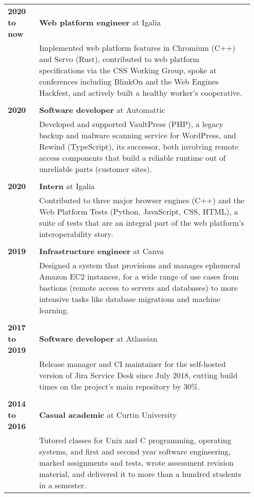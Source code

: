 \documentclass[a4paper,12pt]{article}
\begin{document}
\begin{tabular}{p{35mm}p{125mm}}
	                    \textbf{2020 to now}        & \textbf{Web platform engineer} at Igalia
	\vspace{0.2em}  \\                              & Implemented web platform features in Chromium (C++) and Servo (Rust), contributed to web platform specifications via the CSS Working Group, spoke at conferences including BlinkOn and the Web Engines Hackfest, and actively built a healthy worker’s cooperative.
	\\              \\  \textbf{2020}               & \textbf{Software developer} at Automattic
	\vspace{0.2em}  \\                              & Developed and supported VaultPress (PHP), a legacy backup and malware scanning service for WordPress, and Rewind (TypeScript), its successor, both involving remote access components that build a reliable runtime out of unreliable parts (customer sites).
	\\              \\  \textbf{2020}               & \textbf{Intern} at Igalia
	\vspace{0.2em}  \\                              & Contributed to three major browser engines (C++) and the Web Platform Tests (Python, JavaScript, CSS, HTML), a suite of tests that are an integral part of the web platform’s interoperability story.
	\\              \\  \textbf{2019}               & \textbf{Infrastructure engineer} at Canva
	\vspace{0.2em}  \\                              & Designed a system that provisions and manages ephemeral Amazon EC2 instances, for a wide range of use cases from bastions (remote access to servers and databases) to more intensive tasks like database migrations and machine learning.
	\\              \\  \textbf{2017 to 2019}       & \textbf{Software developer} at Atlassian
	\vspace{0.2em}  \\                              & Release manager and CI maintainer for the self-hosted version of Jira Service Desk since July 2018, cutting build times on the project’s main repository by 30\%.
	\\              \\  \textbf{2014 to 2016}       & \textbf{Casual academic} at Curtin University
	\vspace{0.2em}  \\                              & Tutored classes for Unix and C programming, operating systems, and first and second year software engineering, marked assignments and tests, wrote assessment revision material, and delivered it to more than a hundred students in a semester.
\end{tabular}
\end{document}
